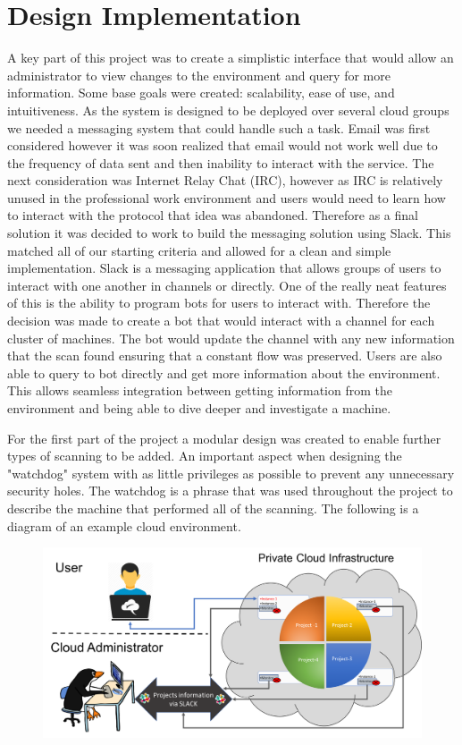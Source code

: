 \documentclass[12pt]{article}
\begin{document}
\section{Design Implementation}
A key part of this project was to create a simplistic interface that would allow an administrator to view changes to the environment and query for more information. Some base goals were created: scalability, ease of use, and intuitiveness. As the system is designed to be deployed over several cloud groups we needed a messaging system that could handle such a task. Email was first considered however it was soon realized that email would not work well due to the frequency of data sent and then inability to interact with the service. The next consideration was Internet Relay Chat (IRC), however as IRC is relatively unused in the professional work environment and users would need to learn how to interact with the protocol that idea was abandoned. Therefore as a final solution it was decided to work to build the messaging solution using Slack. This matched all of our starting criteria and allowed for a clean and simple implementation. Slack is a messaging application that allows groups of users to interact with one another in channels or directly. One of the really neat features of this is the ability to program bots for users to interact with. Therefore the decision was made to create a bot that would interact with a channel for each cluster of machines. The bot would update the channel with any new information that the scan found ensuring that a constant flow was preserved. Users are also able to query to bot directly and get more information about the environment. This allows seamless integration between getting information from the environment and being able to dive deeper and investigate a machine.

For the first part of the project a modular design was created to enable further types of scanning to be added. An important aspect when designing the "watchdog" system with as little privileges as possible to prevent any unnecessary security holes. The watchdog is a phrase that was used throughout the project to describe the machine that performed all of the scanning. The following is a diagram of an example cloud environment.

\begin{figure}[H]
    \centering
    \includegraphics[scale=.4]{./pic/Picture1.png}
\end{figure}
\end{document}
